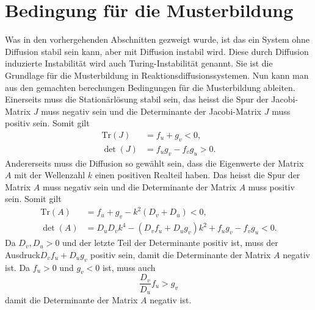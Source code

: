 \section{Bedingung für die Musterbildung
\label{reaktdiff:section:diffusioninduzierteInstabilitaet}}
Was in den vorhergehenden Abschnitten gezweigt wurde, ist das ein System ohne Diffusion stabil sein kann, aber mit Diffusion instabil wird.
Diese durch Diffusion induzierte Instabilität wird auch Turing-Instabilität genannt.
Sie ist die Grundlage für die Musterbildung in Reaktionsdiffusionssystemen.
Nun kann man aus den gemachten berechungen Bedingungen für die Musterbildung ableiten.
Einerseits muss die Stationärlösung stabil sein, das heisst die Spur der Jacobi-Matrix \(J\) muss negativ sein und die Determinante der Jacobi-Matrix \(J\) muss positiv sein.
Somit gilt
\begin{align*}
    \text{Tr}(J) &= f_u + g_v < 0, \\
    \det(J) &= f_u g_v - f_v g_u > 0.
\end{align*}
Andererseits muss die Diffusion so gewählt sein, dass die Eigenwerte der Matrix \(A\) mit der Wellenzahl \(k\) einen positiven Realteil haben.
Das heisst die Spur der Matrix \(A\) muss negativ sein und die Determinante der Matrix \(A\) muss positiv sein.
Somit gilt
\begin{align}
    \text{Tr}(A) &= f_u  + g_v - k^2(D_v + D_u)  < 0, \\
    \det(A) &= D_uD_vk^4 - (D_vf_u + D_ug_v)k^2 + f_u g_v - f_v g_u < 0.
    \label{reaktdiff:equation:reaktdiffbedingunen}
\end{align}
Da \(D_v,D_u > 0\) und der letzte Teil der Determinante positiv ist, muss der Ausdruck\(D_vf_u + D_ug_v\) positiv sein, damit die Determinante der Matrix \(A\) negativ ist.
Da \(f_u > 0\) und \(g_v < 0\) ist, muss auch
\begin{equation}
    \frac{D_v}{D_u}f_u > g_v
\end{equation}
damit die Determinante der Matrix \(A\) negativ ist.

